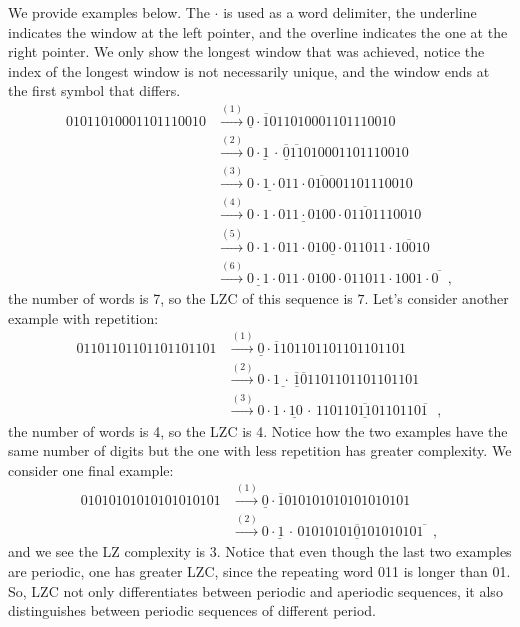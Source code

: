 We provide examples below. The $\cdot$ is used as a word delimiter, the underline indicates the window at the left pointer, and the overline indicates the one at the right pointer. We only show the longest window that was achieved, notice the index of the longest window is not necessarily unique, and the window ends at the first symbol that differs. 
\begin{align*}
01011010001101110010
&\xrightarrow{(1)}
\underline0\cdot\overline{1}011010001101110010\\
&\xrightarrow{(2)}
\underline{0\cdot1\,\cdot\,}\overline{\underline{0}}\overline{11}010001101110010 \\
&\xrightarrow{(3)}
\underline{0\cdot1\cdot01}1\cdot\overline{0100}01101110010 \\
&\xrightarrow{(4)}
0\cdot1\cdot\underline{011\cdot010}0\cdot\overline{011011}10010 \\
&\xrightarrow{(5)}
0\cdot1\cdot011\cdot0\underline{100\cdot0}11011\cdot\overline{1001}0 \\
&\xrightarrow{(6)}
\underline{0\cdot1}\cdot011\cdot0100\cdot011011\cdot1001\cdot\overline{0\text{  }},
\end{align*}
the number of words is 7, so the LZC of this sequence is $7$. Let's consider another example with repetition:
\begin{align*}
01101101101101101101
&\xrightarrow{(1)}
\underline0\cdot\overline{1}101101101101101101\\
&\xrightarrow{(2)}
0\cdot\underline{1\,\cdot\,}\overline{\underline{1}}\overline{0}1101101101101101\\
&\xrightarrow{(3)}
0\cdot\underline{1\cdot10\,\cdot\,}\underline{\overline{11011011011011}}\overline{01\text{  }},
\end{align*}
the number of words is 4, so the LZC is 4. Notice how the two examples have the same number of digits but the one with less repetition has greater complexity. We consider one final example:
\begin{align*}
01010101010101010101
&\xrightarrow{(1)}
\underline{0}\cdot\overline{1}010101010101010101\\
&\xrightarrow{(2)}
\underline{0\cdot1\,\cdot\,}\underline{\overline{01010101010101010}}\overline{1\text{  }},
\end{align*}
and we see the LZ complexity is 3. Notice that even though the last two examples are periodic, one has greater LZC, since the repeating word 011 is longer than 01. So, LZC not only differentiates between periodic and aperiodic sequences, it also distinguishes between periodic sequences of different period.

